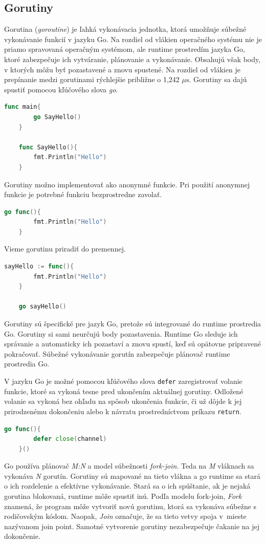 \documentclass[
  biblatex,
  seconds=true,
  language=slovak,
  figures=false,
  urldate=iso,
  glossaries,
  index
]{kidiplom}
\begin{document}
\subsection{Gorutiny}
Gorutina (\emph{goroutine}) je ľahká vykonávacia jednotka, ktorá umožňuje súbežné vykonávanie funkcií v jazyku Go. Na rozdiel od vlákien operačného systému nie je priamo spravovaná operačným systémom, ale runtime prostredím jazyka Go, ktoré zabezpečuje ich vytváranie, plánovanie a vykonávanie. Obsahujú však body, v ktorých môžu byť pozastavené a znovu spustené.
Na rozdiel od vlákien je prepínanie medzi gorutinami rýchlejšie približne o 1,242 $\mu\text{s}$.\cite{cox2017}
Gorutiny sa dajú spustiť pomocou kľúčového slova \emph{go}. 
\begin{lstlisting}[language=Go]
	func main{
		go SayHello()
	}

	func SayHello(){
		fmt.Println("Hello")
	}
\end{lstlisting}
Gorutiny možno implementovať ako anonymné funkcie. Pri použití anonymnej funkcie je potrebné funkciu bezprostredne zavolať. 
\begin{lstlisting}[language=Go]
	go func(){
		fmt.Println("Hello")
	}
\end{lstlisting}

Vieme gorutinu priradiť do premennej.
\begin{lstlisting}[language=Go]
	sayHello := func(){
		fmt.Println("Hello")
	}

	go sayHello()
\end{lstlisting}
Gorutiny sú špecifické pre jazyk Go, pretože sú integrované do runtime prostredia Go.
Gorutiny si sami neurčujú body pozastavenia. Runtime Go sleduje ich správanie a
automaticky ich pozastaví a znovu spustí, keď sú opätovne pripravené pokračovať.
Súbežné vykonávanie gorutín zabezpečuje plánovač runtime prostredia Go. \cite{baugh2010go}

V jazyku Go je možné pomocou kľúčového slova \texttt{defer} zaregistrovať volanie funkcie, ktoré sa vykoná tesne pred ukončením aktuálnej gorutiny. Odložené volanie sa vykoná bez ohľadu na spôsob ukončenia funkcie, či už dôjde k jej prirodzenému dokončeniu alebo k návratu prostredníctvom príkazu \texttt{return}.
\begin{lstlisting}[language=Go]
	go func(){
		defer close(channel)
	}()
\end{lstlisting}

Go používa plánovač \emph{M:N} a model súbežnosti \emph{fork-join}.\cite{cox2017}
Teda na \emph{M} vláknach sa vykonáva \emph{N} gorutín. Gorutiny
sú mapované na tieto vlákna a go runtime sa stará o ich rozdelenie a efektívne vykonávanie. Stará sa o ich spúštanie,
ak je nejaká gorutina blokovaná, runtime môže spustiť inú.
Podľa modelu fork-join, \emph{Fork} znamená, že program môže vytvoriť novú
gorutinu, ktorá sa vykonáva súbežne s rodičovským kódom. Naopak, \emph{Join} označuje, že sa tieto vetvy spoja v~mieste nazývanom
join point.
Samotné vytvorenie gorutiny nezabezpečuje čakanie na jej dokončenie.
\end{document}
